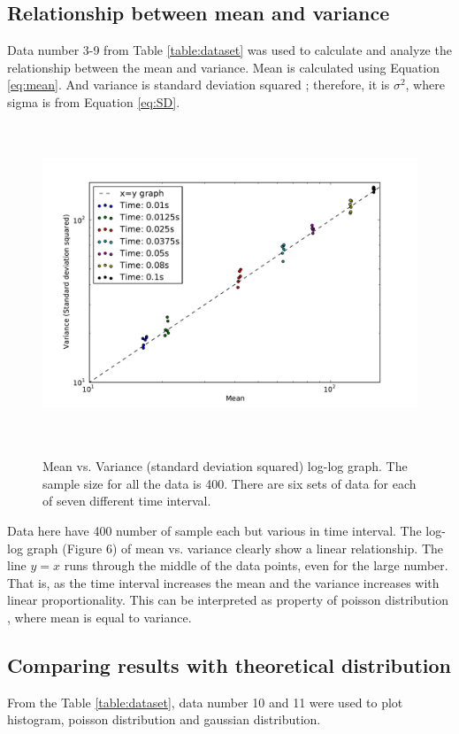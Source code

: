 \documentclass[a4paper,12pt]{article}
\begin{document}
\subsection{Relationship between mean and variance}
\label{sec:meanandvariance}
Data number 3-9 from Table \ref{table:dataset} was used to calculate and analyze the relationship between the mean and variance. Mean is calculated using Equation \ref{eq:mean}. And variance is standard deviation squared \citep{Stat}; therefore, it is $\sigma^{2}$, where sigma is from Equation \ref{eq:SD}. 
\begin{figure}[H]
\centering
\includegraphics[angle=0,height=9.5cm,width=15.5cm]{graphs/Task7_log-log.pdf}
\label{fig:task7log}
\caption{Mean vs. Variance (standard deviation squared) log-log graph. The sample size for all the data is 400. There are six sets of data for each of seven different time interval.}
\end{figure}
Data here have 400 number of sample each but various in time interval. The log-log graph (Figure 6) of mean vs. variance clearly show a linear relationship. The line $y=x$ runs through the middle of the data points, even for the large number. That is, as the time interval increases the mean and the variance increases with linear proportionality. This can be interpreted as property of poisson distribution \citep{Stat}, where mean is equal to variance. 

\subsection{Comparing results with theoretical distribution}
\label{sec:theoretical}
From the Table \ref{table:dataset}, data number 10 and 11 were used to plot histogram, poisson distribution and gaussian distribution.
\end{document}
